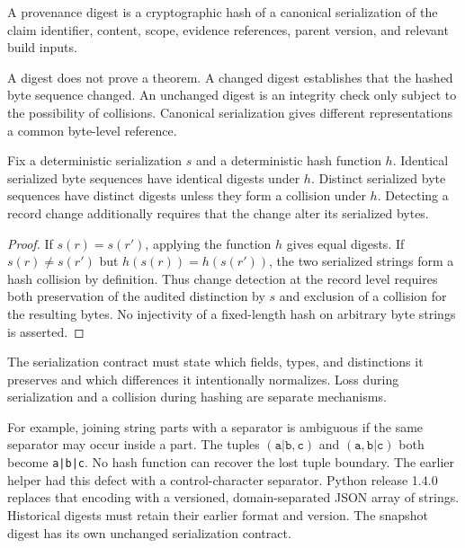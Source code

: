 \begin{PPTdefinition}
\label{PPT:res:16:2}
A provenance digest is a cryptographic hash of a canonical serialization of the claim identifier, content, scope, evidence references, parent version, and relevant build inputs.
\end{PPTdefinition}

A digest does not prove a theorem. A changed digest establishes that the hashed byte sequence changed. An unchanged digest is an integrity check only subject to the possibility of collisions. Canonical serialization gives different representations a common byte-level reference.

\begin{PPTproposition}
\label{PPT:res:16:3}
Fix a deterministic serialization $s$ and a deterministic hash function $h$. Identical serialized byte sequences have identical digests under $h$. Distinct serialized byte sequences have distinct digests unless they form a collision under $h$. Detecting a record change additionally requires that the change alter its serialized bytes.
\end{PPTproposition}

\begin{proof}
If $s(r)=s(r')$, applying the function $h$ gives equal digests. If $s(r)\ne s(r')$ but $h(s(r))=h(s(r'))$, the two serialized strings form a hash collision by definition. Thus change detection at the record level requires both preservation of the audited distinction by $s$ and exclusion of a collision for the resulting bytes. No injectivity of a fixed-length hash on arbitrary byte strings is asserted.
\end{proof}


The serialization contract must state which fields, types, and distinctions it preserves and which differences it intentionally normalizes. Loss during serialization and a collision during hashing are separate mechanisms.

For example, joining string parts with a separator is ambiguous if the same separator may occur inside a part. The tuples $(\texttt{a|b},\texttt{c})$ and $(\texttt{a},\texttt{b|c})$ both become \texttt{a|b|c}. No hash function can recover the lost tuple boundary. The earlier  helper had this defect with a control-character separator. Python release 1.4.0 replaces that encoding with a versioned, domain-separated JSON array of strings. Historical digests must retain their earlier format and version. The snapshot digest has its own unchanged serialization contract.

